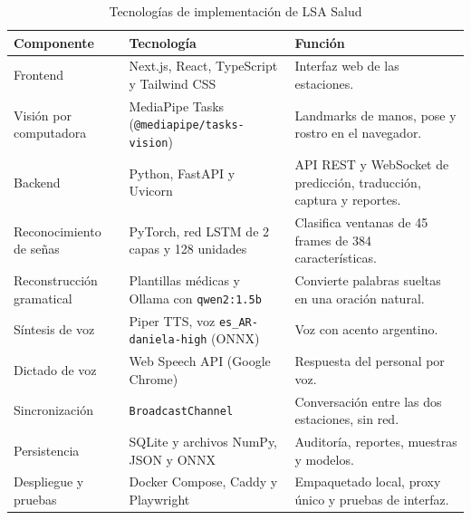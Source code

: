 \begin{table}[H]
  \centering
  \caption{Tecnologías de implementación de LSA Salud}\label{tab:tecnologias}
  \small
  \begin{tabularx}{\textwidth}{>{\raggedright\arraybackslash}p{3.6cm} >{\raggedright\arraybackslash}p{4.8cm} X}
    \toprule
    \textbf{Componente} & \textbf{Tecnología} & \textbf{Función} \\
    \midrule
    Frontend & Next.js, React, TypeScript y Tailwind CSS & Interfaz web de las estaciones. \\
    Visión por computadora & MediaPipe Tasks (\texttt{@mediapipe/\allowbreak tasks-vision}) & Landmarks de manos, pose y rostro en el navegador. \\
    Backend & Python, FastAPI y Uvicorn & API REST y WebSocket de predicción, traducción, captura y reportes. \\
    Reconocimiento de señas & PyTorch, red LSTM de 2 capas y 128 unidades \parencite{hochreiter1997lstm} & Clasifica ventanas de 45 frames de 384 características. \\
    Reconstrucción gramatical & Plantillas médicas y Ollama con \texttt{qwen2:1.5b} & Convierte palabras sueltas en una oración natural. \\
    Síntesis de voz & Piper TTS, voz \texttt{es\_AR-daniela-high} (ONNX) & Voz con acento argentino. \\
    Dictado de voz & Web Speech API (Google Chrome) & Respuesta del personal por voz. \\
    Sincronización & \texttt{BroadcastChannel} & Conversación entre las dos estaciones, sin red. \\
    Persistencia & SQLite y archivos NumPy, JSON y ONNX & Auditoría, reportes, muestras y modelos. \\
    Despliegue y pruebas & Docker Compose, Caddy y Playwright & Empaquetado local, proxy único y pruebas de interfaz. \\
    \bottomrule
  \end{tabularx}
\end{table}

